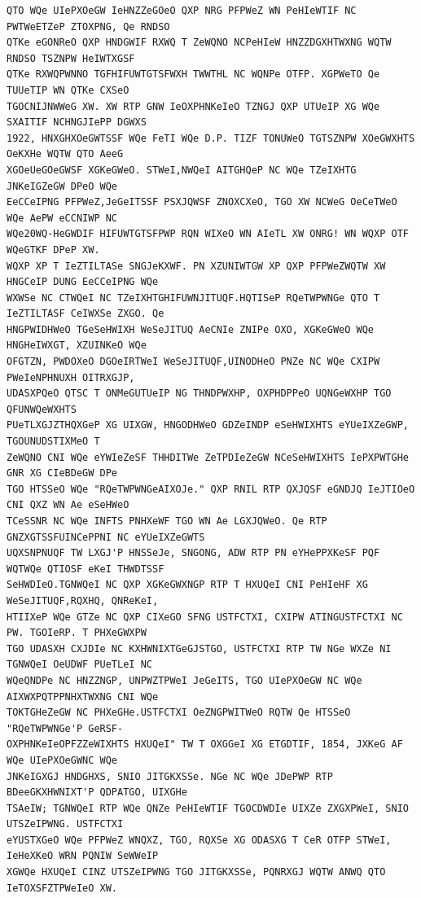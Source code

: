 \documentclass[12pt,a4paper]{article}
\begin{document}
\begin{lstlisting}[style=ciphertext,caption={Complete text after iteration 1}]
QTO WQe UIePXOeGW IeHNZZeGOeO QXP NRG PFPWeZ WN PeHIeWTIF NC PWTWeETZeP ZTOXPNG, Qe RNDSO
QTKe eGONReO QXP HNDGWIF RXWQ T ZeWQNO NCPeHIeW HNZZDGXHTWXNG WQTW RNDSO TSZNPW HeIWTXGSF
QTKe RXWQPWNNO TGFHIFUWTGTSFWXH TWWTHL NC WQNPe OTFP. XGPWeTO Qe TUUeTIP WN QTKe CXSeO
TGOCNIJNWWeG XW. XW RTP GNW IeOXPHNKeIeO TZNGJ QXP UTUeIP XG WQe SXAITIF NCHNGJIePP DGWXS
1922, HNXGHXOeGWTSSF WQe FeTI WQe D.P. TIZF TONUWeO TGTSZNPW XOeGWXHTS OeKXHe WQTW QTO AeeG
XGOeUeGOeGWSF XGKeGWeO. STWeI,NWQeI AITGHQeP NC WQe TZeIXHTG JNKeIGZeGW DPeO WQe
EeCCeIPNG PFPWeZ,JeGeITSSF PSXJQWSF ZNOXCXeO, TGO XW NCWeG OeCeTWeO WQe AePW eCCNIWP NC
WQe20WQ-HeGWDIF HIFUWTGTSFPWP RQN WIXeO WN AIeTL XW ONRG! WN WQXP OTF WQeGTKF DPeP XW.
WQXP XP T IeZTILTASe SNGJeKXWF. PN XZUNIWTGW XP QXP PFPWeZWQTW XW HNGCeIP DUNG EeCCeIPNG WQe
WXWSe NC CTWQeI NC TZeIXHTGHIFUWNJITUQF.HQTISeP RQeTWPWNGe QTO T IeZTILTASF CeIWXSe ZXGO. Qe
HNGPWIDHWeO TGeSeHWIXH WeSeJITUQ AeCNIe ZNIPe OXO, XGKeGWeO WQe HNGHeIWXGT, XZUINKeO WQe
OFGTZN, PWDOXeO DGOeIRTWeI WeSeJITUQF,UINODHeO PNZe NC WQe CXIPW PWeIeNPHNUXH OITRXGJP,
UDASXPQeO QTSC T ONMeGUTUeIP NG THNDPWXHP, OXPHDPPeO UQNGeWXHP TGO QFUNWQeWXHTS
PUeTLXGJZTHQXGeP XG UIXGW, HNGODHWeO GDZeINDP eSeHWIXHTS eYUeIXZeGWP, TGOUNUDSTIXMeO T
ZeWQNO CNI WQe eYWIeZeSF THHDITWe ZeTPDIeZeGW NCeSeHWIXHTS IePXPWTGHe GNR XG CIeBDeGW DPe
TGO HTSSeO WQe "RQeTWPWNGeAIXOJe." QXP RNIL RTP QXJQSF eGNDJQ IeJTIOeO CNI QXZ WN Ae eSeHWeO
TCeSSNR NC WQe INFTS PNHXeWF TGO WN Ae LGXJQWeO. Qe RTP GNZXGTSSFUINCePPNI NC eYUeIXZeGWTS
UQXSNPNUQF TW LXGJ'P HNSSeJe, SNGONG, ADW RTP PN eYHePPXKeSF PQF WQTWQe QTIOSF eKeI THWDTSSF
SeHWDIeO.TGNWQeI NC QXP XGKeGWXNGP RTP T HXUQeI CNI PeHIeHF XG WeSeJITUQF,RQXHQ, QNReKeI,
HTIIXeP WQe GTZe NC QXP CIXeGO SFNG USTFCTXI, CXIPW ATINGUSTFCTXI NC PW. TGOIeRP. T PHXeGWXPW
TGO UDASXH CXJDIe NC KXHWNIXTGeGJSTGO, USTFCTXI RTP TW NGe WXZe NI TGNWQeI OeUDWF PUeTLeI NC
WQeQNDPe NC HNZZNGP, UNPWZTPWeI JeGeITS, TGO UIePXOeGW NC WQe AIXWXPQTPPNHXTWXNG CNI WQe
TOKTGHeZeGW NC PHXeGHe.USTFCTXI OeZNGPWITWeO RQTW Qe HTSSeO "RQeTWPWNGe'P GeRSF-
OXPHNKeIeOPFZZeWIXHTS HXUQeI" TW T OXGGeI XG ETGDTIF, 1854, JXKeG AF WQe UIePXOeGWNC WQe
JNKeIGXGJ HNDGHXS, SNIO JITGKXSSe. NGe NC WQe JDePWP RTP BDeeGKXHWNIXT'P QDPATGO, UIXGHe
TSAeIW; TGNWQeI RTP WQe QNZe PeHIeWTIF TGOCDWDIe UIXZe ZXGXPWeI, SNIO UTSZeIPWNG. USTFCTXI
eYUSTXGeO WQe PFPWeZ WNQXZ, TGO, RQXSe XG ODASXG T CeR OTFP STWeI, IeHeXKeO WRN PQNIW SeWWeIP
XGWQe HXUQeI CINZ UTSZeIPWNG TGO JITGKXSSe, PQNRXGJ WQTW ANWQ QTO IeTOXSFZTPWeIeO XW.
\end{lstlisting}
\end{document}
